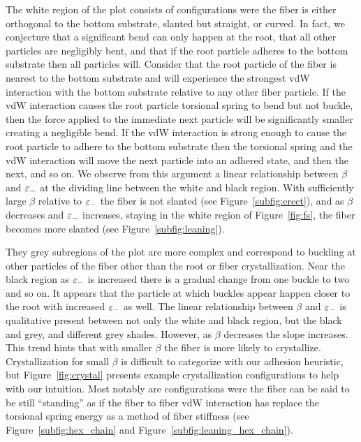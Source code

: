 The white region of the plot consists of configurations were the fiber is either orthogonal to the bottom substrate, slanted but straight, or curved. In fact, we conjecture that a significant bend can only happen at the root, that all other particles are negligibly bent, and that if the root particle adheres to the bottom substrate then all particles will. Consider that the root particle of the fiber is nearest to the bottom substrate and will experience the strongest vdW interaction with the bottom substrate relative to any other fiber particle. If the vdW interaction causes the root particle torsional spring to bend but not buckle, then the force applied to the immediate next particle will be significantly smaller creating a negligible bend. If the vdW interaction is strong enough to cause the root particle to adhere to the bottom substrate then the torsional spring and the vdW interaction will move the next particle into an adhered state, and then the next, and so on. We observe from this argument a linear relationship between $\beta$ and $\varepsilon_-$ at the dividing line between the white and black region. With sufficiently large $\beta$ relative to $\varepsilon_-$ the fiber is not slanted (see Figure~\ref{subfig:erect}), and as $\beta$ decreases and $\varepsilon_-$ increases, staying in the white region of Figure~\ref{fig:fs}, the fiber becomes more slanted (see Figure~\ref{subfig:leaning}).

They grey subregions of the plot are more complex and correspond to buckling at other particles of the fiber other than the root or fiber crystallization. Near the black region as $\varepsilon_-$ is increased there is a gradual change from one buckle to two and so on. It appears that the particle at which buckles appear happen closer to the root with increased $\varepsilon_-$ as well. The linear relationship between $\beta$ and $\varepsilon_-$ is qualitative present between not only the white and black region, but the black and grey, and different grey shades. However, as $\beta$ decreases the slope increases. This trend hints that with smaller $\beta$ the fiber is more likely to crystallize. Crystallization for small $\beta$ is difficult to categorize with our adhesion heuristic, but Figure~\ref{fig:crystal} presents example crystallization configurations to help with our intuition. Most notably are configurations were the fiber can be said to be still ``standing'' as if the fiber to fiber vdW interaction has replace the torsional spring energy as a method of fiber stiffness (see Figure~\ref{subfig:hex_chain} and Figure~\ref{subfig:leaning_hex_chain}).

